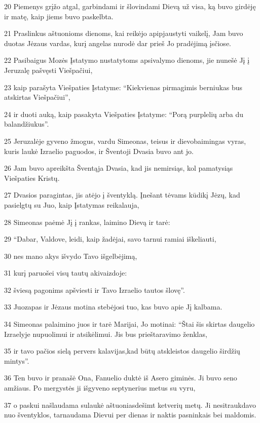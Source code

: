 \par 20 Piemenys grįžo atgal, garbindami ir šlovindami Dievą už visa, ką buvo girdėję ir matę, kaip jiems buvo paskelbta. 
\par 21 Praslinkus aštuonioms dienoms, kai reikėjo apipjaustyti vaikelį, Jam buvo duotas Jėzaus vardas, kurį angelas nurodė dar prieš Jo pradėjimą įsčiose. 
\par 22 Pasibaigus Mozės Įstatymo nustatytoms apsivalymo dienoms, jie nunešė Jį į Jeruzalę pašvęsti Viešpačiui,­ 
\par 23 kaip parašyta Viešpaties Įstatyme: “Kiekvienas pirmagimis berniukas bus atskirtas Viešpačiui”,­ 
\par 24 ir duoti auką, kaip pasakyta Viešpaties Įstatyme: “Porą purplelių arba du balandžiukus”. 
\par 25 Jeruzalėje gyveno žmogus, vardu Simeonas, teisus ir dievobaimingas vyras, kuris laukė Izraelio paguodos, ir Šventoji Dvasia buvo ant jo. 
\par 26 Jam buvo apreikšta Šventąja Dvasia, kad jis nemirsiąs, kol pamatysiąs Viešpaties Kristų. 
\par 27 Dvasios paragintas, jis atėjo į šventyklą. Įnešant tėvams kūdikį Jėzų, kad pasielgtų su Juo, kaip Įstatymas reikalauja, 
\par 28 Simeonas paėmė Jį į rankas, laimino Dievą ir tarė: 
\par 29 “Dabar, Valdove, leidi, kaip žadėjai, savo tarnui ramiai iškeliauti, 
\par 30 nes mano akys išvydo Tavo išgelbėjimą, 
\par 31 kurį paruošei visų tautų akivaizdoje: 
\par 32 šviesą pagonims apšviesti ir Tavo Izraelio tautos šlovę”. 
\par 33 Juozapas ir Jėzaus motina stebėjosi tuo, kas buvo apie Jį kalbama. 
\par 34 Simeonas palaimino juos ir tarė Marijai, Jo motinai: “Štai šis skirtas daugelio Izraelyje nupuolimui ir atsikėlimui. Jis bus prieštaravimo ženklas,­ 
\par 35 ir tavo pačios sielą pervers kalavijas,­kad būtų atskleistos daugelio širdžių mintys”. 
\par 36 Ten buvo ir pranašė Ona, Fanuelio duktė iš Asero giminės. Ji buvo seno amžiaus. Po mergystės ji išgyveno septynerius metus su vyru, 
\par 37 o paskui našlaudama sulaukė aštuoniasdešimt ketverių metų. Ji nesitraukdavo nuo šventyklos, tarnaudama Dievui per dienas ir naktis pasninkais bei maldomis. 
